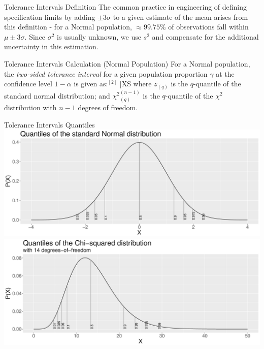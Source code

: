 \documentclass[t]{beamer}
\begin{document}

\begin{ftst}
{Tolerance Intervals}
{Definition}
The common practice in engineering of defining specification limits by adding $\pm3\sigma$ to a given estimate of the mean arises from this definition - for a Normal population, $\approx 99.75\%$ of observations fall within $\mu\pm3\sigma$.
\vone
Since $\sigma^2$ is usually unknown, we use $s^2$ and compensate for the additional uncertainty in this estimation. 
\end{ftst}



\begin{ftst}
{Tolerance Intervals}
{Calculation (Normal Population)}
For a Normal population, the \textit{two-sided tolerance interval} for a given population proportion $\gamma$ at the confidence level $1-\alpha$ is given as:$^{[2]}$
\beqs
\bar{X}\pm S 
\eqs
\vhalf
\noindent where $z_{(q)}$ is the $q$-quantile of the standard normal distribution; and ${\chi^2}_{(q)}^{(n-1)}$ is the $q$-quantile of the $\chi^2$ distribution with $n-1$ degrees of freedom.
\end{ftst}


\begin{ftst}
	{Tolerance Intervals}
	{Quantiles}	
\flushleft\includegraphics[width=.75\textwidth]{../figs/quantiles-normal.pdf}\\
\flushright\includegraphics[width=.75\textwidth]{../figs/quantiles-chisq.pdf}
\end{ftst}
\end{document}
